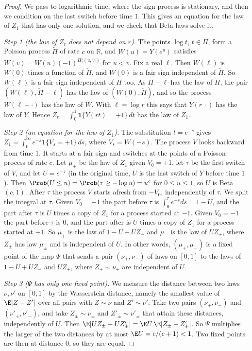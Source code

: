 \begin{proof}
We pass to logarithmic time, where the sign process is stationary, and then
we condition on the last switch before time $1$. This gives an equation for
the law of $Z_1$ that has only one solution, and we check that Beta laws
solve it.

\emph{Step 1 (the law of $Z_r$ does not depend on $r$).} The points $\log t$,
$t\in\Pi$, form a Poisson process $\tilde\Pi$ of rate $c$ on $\mathbb R$, and
$W(u)=Y(e^u)$ satisfies $W(v)=W(u)(-1)^{\tilde\Pi((u,v])}$ for $u<v$. Fix a
real $\ell$. Then $W(\ell)$ is $W(0)$ times a function of $\tilde\Pi$, and
$W(0)$ is a fair sign independent of $\tilde\Pi$. So $W(\ell)$ is a fair sign
independent of $\tilde\Pi$ too. As $\tilde\Pi-\ell$ has the law of
$\tilde\Pi$, the pair $(W(\ell),\tilde\Pi-\ell)$ has the law of
$(W(0),\tilde\Pi)$, and so the process $W(\ell+\cdot)$ has the law of $W$.
With $\ell=\log r$ this says that $Y(r\,\cdot)$ has the law of $Y$. Hence
$Z_r=\int_0^1\mathbf 1\{Y(rt)=+1\}\,dt$ has the law of $Z_1$.

\emph{Step 2 (an equation for the law of $Z_1$).} The substitution $t=e^{-s}$
gives $Z_1=\int_0^\infty e^{-s}\mathbf 1\{V_s=+1\}\,ds$, where $V_s=W(-s)$.
The process $V$ looks backward from time $1$. It starts at a fair sign and
switches at the points of a Poisson process of rate $c$. Let $\mu_\pm$ be the
law of $Z_1$ given $V_0=\pm1$, let $\tau$ be the first switch of $V$, and let
$U=e^{-\tau}$ (in the original time, $U$ is the last switch of $Y$ before
time $1$). Then $\Prob(U\le u)=\Prob(\tau\ge-\log u)=u^c$ for $0\le u\le1$, so
$U$ is Beta$(c,1)$. After $\tau$ the process $V$ starts afresh from $-V_0$,
independently of $\tau$. We split the integral at $\tau$. Given $V_0=+1$ the
part before $\tau$ is $\int_0^\tau e^{-s}ds=1-U$, and the part after $\tau$
is $U$ times a copy of $Z_1$ for a process started at $-1$. Given $V_0=-1$
the part before $\tau$ is $0$, and the part after is $U$ times a copy of
$Z_1$ for a process started at $+1$. So $\mu_+$ is the law of $1-U+UZ_-$ and
$\mu_-$ is the law of $UZ_+$, where $Z_\pm$ has law $\mu_\pm$ and is
independent of $U$. In other words, $(\mu_+,\mu_-)$ is a fixed point of the
map $\Psi$ that sends a pair $(\nu_+,\nu_-)$ of laws on $[0,1]$ to the laws
of $1-U+UZ_-$ and $UZ_+$, where $Z_\pm\sim\nu_\pm$ are independent of $U$.

\emph{Step 3 ($\Psi$ has only one fixed point).} We measure the distance
between two laws $\nu,\nu'$ on $[0,1]$ by the Wasserstein distance, namely
the smallest value of $\E\lvert Z-Z'\rvert$ over all pairs with $Z\sim\nu$
and $Z'\sim\nu'$. Take two pairs $(\nu_+,\nu_-)$ and $(\nu'_+,\nu'_-)$, and
take $Z_\pm\sim\nu_\pm$ and $Z'_\pm\sim\nu'_\pm$ that attain these distances,
independently of $U$. Then
$\E\lvert UZ_\pm-UZ'_\pm\rvert=\E U\,\E\lvert Z_\pm-Z'_\pm\rvert$. So $\Psi$
multiplies the larger of the two distances by at most $\E U=c/(c+1)<1$. Two
fixed points are then at distance $0$, so they are equal.


\end{proof}
